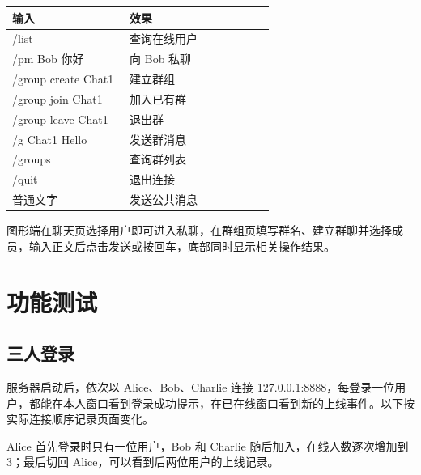 \documentclass[UTF8,a4paper,10pt,fontset=fandol]{ctexart}
\begin{document}
\medskip
{}
\medskip
{}
\medskip
\par\medskip\noindent\begin{minipage}{\linewidth}\centering
\begin{tabular}{@{}>{\raggedright\arraybackslash}p{0.434\linewidth}>{\raggedright\arraybackslash}p{0.531\linewidth}@{}}
\toprule
输入 & 效果\\
\midrule
/list & 查询在线用户\\
/pm Bob 你好 & 向 Bob 私聊\\
/group create Chat1 & 建立群组\\
/group join Chat1 & 加入已有群\\
/group leave Chat1 & 退出群\\
/g Chat1 Hello & 发送群消息\\
/groups & 查询群列表\\
/quit & 退出连接\\
普通文字 & 发送公共消息\\
\bottomrule
\end{tabular}
\end{minipage}\par\medskip
图形端在聊天页选择用户即可进入私聊，在群组页填写群名、建立群聊并选择成员，输入正文后点击发送或按回车，底部同时显示相关操作结果。

\section{功能测试}
\subsection{三人登录}
服务器启动后，依次以 Alice、Bob、Charlie 连接 127.0.0.1:8888，每登录一位用户，都能在本人窗口看到登录成功提示，在已在线窗口看到新的上线事件。以下按实际连接顺序记录页面变化。

Alice 首先登录时只有一位用户，Bob 和 Charlie 随后加入，在线人数逐次增加到 3；最后切回 Alice，可以看到后两位用户的上线记录。
\end{document}
